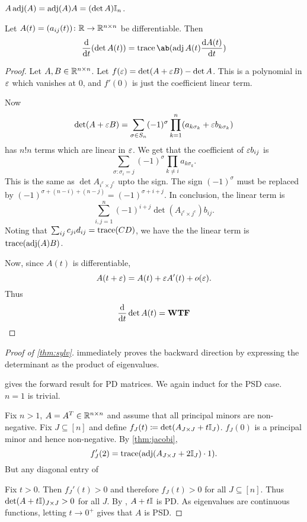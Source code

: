 \begin{fact}
    $A \operatorname{adj}(A) = \operatorname{adj}(A) A = (\det A) \mathbb{I}_n$.
\end{fact}

\begin{theorem} \label{thm:jacobi}
    Let $A(t) = (a_{ij}(t))\colon \mathbb{R} \to \mathbb{R}^{n \times n}$ be differentiable.
    Then \[
        \odv{}{t} (\det A(t)) = \trace \ab(\adj A(t) \odv{A(t)}{t})
    \]
\end{theorem}
\begin{proof}
    Let $A, B \in \mathbb{R}^{n \times n}$.
    Let $f(\varepsilon) = \det(A + \varepsilon B) - \det A$.
    This is a polynomial in $\varepsilon$ which vanishes at $0$,
    and $f'(0)$ is just the coefficient linear term.

    Now \[
        \det(A + \varepsilon B) = \sum_{\sigma \in S_n} (-1)^\sigma
            \prod_{k=1}^n (a_{k\sigma_k} + \varepsilon b_{k\sigma_k})
    \] has $n! n$ terms which are linear in $\varepsilon$.
    We get that the coefficient of $\varepsilon b_{ij}$ is \[
        \sum_{\sigma: \sigma_i = j} (-1)^\sigma
            \prod_{k \ne i} a_{k \sigma_k}.
    \] This is the same as $\det A_{i^c \times j^c}$ upto the sign.
    The sign $(-1)^\sigma$ must be replaced by
    $(-1)^{\sigma + (n - i) + (n - j)} = (-1)^{\sigma + i + j}$.
    In conclusion, the linear term is \[
        \sum_{i,j = 1}^n (-1)^{i+j} \det (A_{i^c \times j^c}) b_{ij}.
    \]
    Noting that $\sum_{ij} c_{ji} d_{ij} = \operatorname{trace}(CD)$, we have the the
    linear term is $\operatorname{trace}(\operatorname{adj}(A)B)$.

    Now, since $A(t)$ is differentiable, \[
        A(t + \varepsilon) = A(t) + \varepsilon A'(t) + o(\varepsilon).
    \] Thus \[
        \odv{}{t} \det A(t) = \mathbf{WTF}
    \]
\end{proof}

\begin{proof}[Proof of \cref{thm:sylv}]
     immediately proves the backward direction by
    expressing the determinant as the product of eigenvalues.

     gives the forward result for PD matrices.
    We again induct for the PSD case.
    $n = 1$ is trivial.

    Fix $n > 1$, $A = A^T \in \mathbb{R}^{n \times n}$ and assume that all principal
    minors are non-negative.
    Fix $J \subseteq [n]$ and define
    $f_J(t) \coloneq \det(A_{J \times J} + t \mathbb{I}_J)$.
    $f_J(0)$ is a principal minor and hence non-negative.
    By \cref{thm:jacobi}, \[
        f_J'(2) = \operatorname{trace}(\operatorname{adj}(A_{J \times J} + 2 \mathbb{I}_J) \cdot 1).
    \] But any diagonal entry of


    Fix $t > 0$.
    Then $f_J'(t) > 0$ and therefore $f_J(t) > 0$ for all $J \subseteq [n]$.
    Thus $\det(A + t \mathbb{I})_{J \times J} > 0$ for all $J$.
    By , $A + t \mathbb{I}$ is PD.
    As eigenvalues are continuous functions, letting $t \to 0^+$ gives that
    $A$ is PSD.
\end{proof}
